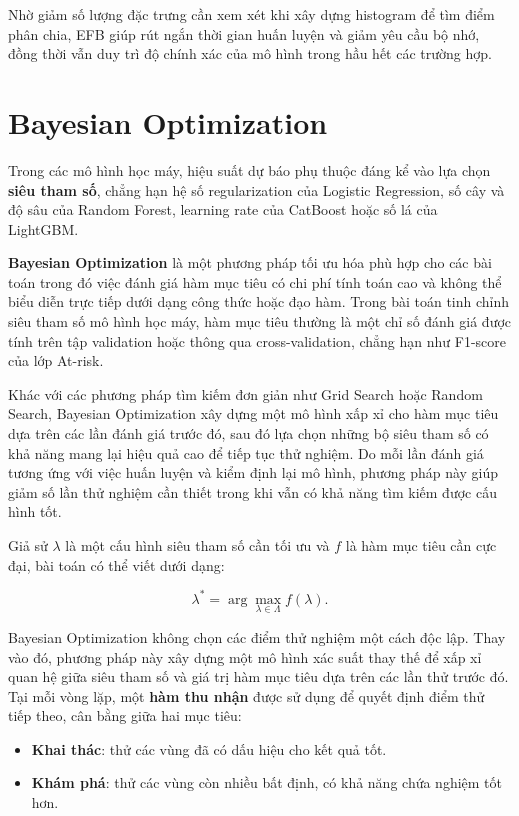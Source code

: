 \documentclass[a4paper]{report}
\begin{document}
Nhờ giảm số lượng đặc trưng cần xem xét khi xây dựng histogram để tìm điểm
phân chia, EFB giúp rút ngắn thời gian huấn luyện và giảm yêu cầu bộ nhớ, đồng
thời vẫn duy trì độ chính xác của mô hình trong hầu hết các trường hợp.

\section{Bayesian Optimization}
\label{sec:bayes_opt}

Trong các mô hình học máy, hiệu suất dự báo phụ thuộc đáng kể vào lựa chọn
\textbf{siêu tham số}, chẳng hạn hệ số regularization của
Logistic Regression, số cây và độ sâu của Random Forest, learning rate của
CatBoost hoặc số lá của LightGBM. 

\textbf{Bayesian Optimization} là một phương pháp tối ưu hóa phù hợp cho các
bài toán trong đó việc đánh giá hàm mục tiêu có chi phí tính toán cao và không
thể biểu diễn trực tiếp dưới dạng công thức hoặc đạo hàm. Trong bài toán tinh
chỉnh siêu tham số mô hình học máy, hàm mục tiêu thường là một chỉ số đánh giá
được tính trên tập validation hoặc thông qua cross-validation, chẳng hạn như
F1-score của lớp At-risk.

Khác với các phương pháp tìm kiếm đơn giản như Grid Search hoặc Random Search,
Bayesian Optimization xây dựng một mô hình xấp xỉ cho hàm mục tiêu dựa trên các
lần đánh giá trước đó, sau đó lựa chọn những bộ siêu tham số có khả năng mang
lại hiệu quả cao để tiếp tục thử nghiệm. Do mỗi lần đánh giá tương ứng với việc
huấn luyện và kiểm định lại mô hình, phương pháp này giúp giảm số lần thử
nghiệm cần thiết trong khi vẫn có khả năng tìm kiếm được cấu hình tốt.

Giả sử $\lambda$ là một cấu hình siêu tham số cần tối ưu và $f$ là hàm mục tiêu
cần cực đại, bài toán có thể viết dưới dạng:

\[
  \lambda^{*}
  =
  \arg\max_{\lambda\in\Lambda} f(\lambda).
\]

Bayesian Optimization không chọn các điểm thử nghiệm một cách độc lập. Thay
vào đó, phương pháp này xây dựng một mô hình xác suất thay thế để xấp xỉ quan
hệ giữa siêu tham số và giá trị hàm
mục tiêu dựa trên các lần thử trước đó. Tại mỗi vòng lặp, một \textbf{hàm thu
nhận} được sử dụng để quyết định điểm thử tiếp theo, cân bằng giữa hai mục tiêu:

\begin{itemize}[leftmargin=*]
  \item \textbf{Khai thác}: thử các vùng đã có dấu hiệu cho kết
        quả tốt.
  \item \textbf{Khám phá}: thử các vùng còn nhiều bất định, có
        khả năng chứa nghiệm tốt hơn.
\end{itemize}
\end{document}
